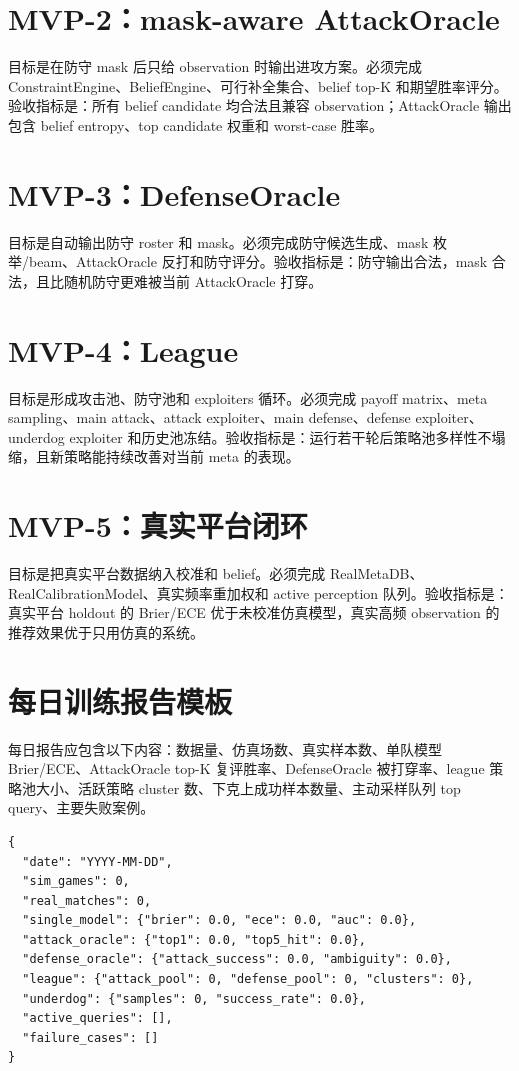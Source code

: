 \documentclass[UTF8,12pt,openany]{ctexbook}
\begin{document}
\section{MVP-2：mask-aware AttackOracle}
目标是在防守 mask 后只给 observation 时输出进攻方案。必须完成 ConstraintEngine、BeliefEngine、可行补全集合、belief top-K 和期望胜率评分。验收指标是：所有 belief candidate 均合法且兼容 observation；AttackOracle 输出包含 belief entropy、top candidate 权重和 worst-case 胜率。

\section{MVP-3：DefenseOracle}
目标是自动输出防守 roster 和 mask。必须完成防守候选生成、mask 枚举/beam、AttackOracle 反打和防守评分。验收指标是：防守输出合法，mask 合法，且比随机防守更难被当前 AttackOracle 打穿。

\section{MVP-4：League}
目标是形成攻击池、防守池和 exploiters 循环。必须完成 payoff matrix、meta sampling、main attack、attack exploiter、main defense、defense exploiter、underdog exploiter 和历史池冻结。验收指标是：运行若干轮后策略池多样性不塌缩，且新策略能持续改善对当前 meta 的表现。

\section{MVP-5：真实平台闭环}
目标是把真实平台数据纳入校准和 belief。必须完成 RealMetaDB、RealCalibrationModel、真实频率重加权和 active perception 队列。验收指标是：真实平台 holdout 的 Brier/ECE 优于未校准仿真模型，真实高频 observation 的推荐效果优于只用仿真的系统。

\section{每日训练报告模板}
每日报告应包含以下内容：数据量、仿真场数、真实样本数、单队模型 Brier/ECE、AttackOracle top-K 复评胜率、DefenseOracle 被打穿率、league 策略池大小、活跃策略 cluster 数、下克上成功样本数量、主动采样队列 top query、主要失败案例。

\begin{lstlisting}[caption={每日训练报告 JSON 模板}]
{
  "date": "YYYY-MM-DD",
  "sim_games": 0,
  "real_matches": 0,
  "single_model": {"brier": 0.0, "ece": 0.0, "auc": 0.0},
  "attack_oracle": {"top1": 0.0, "top5_hit": 0.0},
  "defense_oracle": {"attack_success": 0.0, "ambiguity": 0.0},
  "league": {"attack_pool": 0, "defense_pool": 0, "clusters": 0},
  "underdog": {"samples": 0, "success_rate": 0.0},
  "active_queries": [],
  "failure_cases": []
}
\end{lstlisting}
\end{document}
